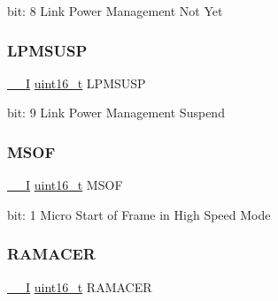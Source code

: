 bit\+: 8 Link Power Management Not Yet \mbox{\label{union_u_s_b___d_e_v_i_c_e___i_n_t_f_l_a_g___type_a3ef3e564079901972fb3d188ad1a2c97}} 
\subsubsection{\texorpdfstring{LPMSUSP}{LPMSUSP}}
{\footnotesize\ttfamily \mbox{\hyperlink{core__cm0plus_8h_af63697ed9952cc71e1225efe205f6cd3}{\+\_\+\+\_\+I}} \mbox{\hyperlink{union_u_s_b___d_e_v_i_c_e___i_n_t_f_l_a_g___type_a25e8fd3335b0c4872c6e2910bd01f0f6}{uint16\+\_\+t}} L\+P\+M\+S\+U\+SP}

bit\+: 9 Link Power Management Suspend \mbox{\label{union_u_s_b___d_e_v_i_c_e___i_n_t_f_l_a_g___type_a45a83335e0a09100aafcebaceba06291}} 
\subsubsection{\texorpdfstring{MSOF}{MSOF}}
{\footnotesize\ttfamily \mbox{\hyperlink{core__cm0plus_8h_af63697ed9952cc71e1225efe205f6cd3}{\+\_\+\+\_\+I}} \mbox{\hyperlink{union_u_s_b___d_e_v_i_c_e___i_n_t_f_l_a_g___type_a25e8fd3335b0c4872c6e2910bd01f0f6}{uint16\+\_\+t}} M\+S\+OF}

bit\+: 1 Micro Start of Frame in High Speed Mode \mbox{\label{union_u_s_b___d_e_v_i_c_e___i_n_t_f_l_a_g___type_ae00d719be68c6fab73a58bd3ae5ff526}} 
\subsubsection{\texorpdfstring{RAMACER}{RAMACER}}
{\footnotesize\ttfamily \mbox{\hyperlink{core__cm0plus_8h_af63697ed9952cc71e1225efe205f6cd3}{\+\_\+\+\_\+I}} \mbox{\hyperlink{union_u_s_b___d_e_v_i_c_e___i_n_t_f_l_a_g___type_a25e8fd3335b0c4872c6e2910bd01f0f6}{uint16\+\_\+t}} R\+A\+M\+A\+C\+ER}

